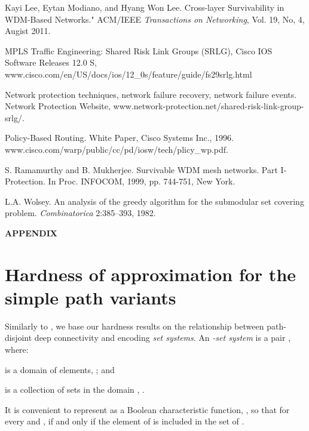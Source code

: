 \LongVersion \documentclass[11pt]{article}
\theoremstyle{definition}
\theoremstyle{plain}
\newcounter{smallitemizec}
\newenvironment{smallitemize}
{   \setcounter{smallitemizec}{0}
    \vspace{-0.5ex}
  \begin{list}{}
    {\usecounter{smallitemizec}
      \setlength{\parsep}{0pt}
      \setlength{\itemsep}{0pt}}
    }{ \end{list}
   \vspace{-0.5ex}
}
\begin{document}
\begin{thebibliography}{99}
Kayi Lee, Eytan Modiano, and Hyang Won Lee.
Cross-layer Survivability in WDM-Based Networks." ACM/IEEE \emph{Transactions on Networking}, Vol. 19, No, 4, Augist 2011.

MPLS Traffic Engineering: Shared Risk Link Groups (SRLG),
Cisco IOS Software Releases 12.0 S,
www.cisco.com/en/US/docs/ios/12\_0s/feature/guide/fs29srlg.html

Network protection techniques, network failure recovery, network failure events.
Network Protection Website,
www.network-protection.net/shared-risk-link-group-srlg/.

Policy-Based Routing.
White Paper, Cisco Systems Inc., 1996. \\
www.cisco.com/warp/public/cc/pd/iosw/tech/plicy\_wp.pdf.

S. Ramamurthy and B. Mukherjee.
Survivable WDM mesh networks. Part I-Protection.
In Proc. INFOCOM, 1999, pp. 744-751, New York.

L.A. Wolsey.
An analysis of the greedy algorithm for the submodular set covering problem.
\emph{Combinatorica} 2:385--393, 1982.

\end{thebibliography}

\clearpage

\appendix

\renewcommand{\theequation}{A-\arabic{equation}}
\setcounter{equation}{0}
\begin{center}
\textbf{\large{APPENDIX}}
\end{center}

\section{Hardness of approximation for the simple path variants}
\label{appendix:Hardness}
Similarly to \cite{prev}, we base our hardness results on the relationship
between path-disjoint deep connectivity and encoding \emph{set systems}.
An \emph{-set system}  is a pair , where: 
\begin{smallitemize}
\item
 is a domain of elements, ; and
\item 
 is a collection of sets in the domain , .
\end{smallitemize}
It is convenient to represent  as a Boolean characteristic function,
, so that for every 
and ,  if and only if the  element
of  is included in the  set of .
\end{document}
